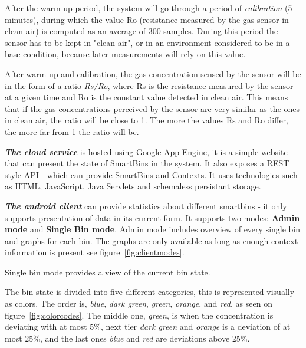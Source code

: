 After the warm-up period, the system will go through a period of \textit{calibration} (5 minutes), during which the value Ro (resistance measured by the gas sensor in clean air) is computed as an average of 300 samples.
During this period the sensor has to be kept in "clean air", or  in an environment considered to be in a base condition, because later measurements will rely on this value.

After warm up and calibration, the gas concentration sensed by the sensor will be in the form of a ratio \textit{Rs/Ro}, where Rs is the resistance measured by the sensor at a given time and Ro is the constant value detected in clean air.
This means that if the gas concentrations perceived by the sensor are very similar as the ones in clean air, the ratio will be close to 1.
The more the values Rs and Ro differ, the more far from 1 the ratio will be.

\textit{ \textbf{The cloud service}} is hosted using Google App Engine, it is a simple website that can present the state of SmartBins in the system. It also exposes a REST style API - which can provide SmartBins and Contexts.
It uses technologies such as HTML, JavaScript, Java Servlets and schemaless persistant storage.

\textit{\textbf{The android client}} can provide statistics about different smartbins - it only supports  presentation of data in its current form.
It supports two modes: \textbf{Admin mode} and \textbf{Single Bin mode}.
Admin mode includes overview of every single bin and graphs for each bin. The graphs are only available as long as enough context information is present see figure~\ref{fig:clientmodes}.

 Single bin mode provides a view of the current bin state.
 
 The bin state is divided into five different categories, this is represented visually as colors.
 The order is, \textit{blue}, \textit{dark green}, \textit{green}, \textit{orange}, and \textit{red}, as seen on figure~\ref{fig:colorcodes}.
The middle one, \textit{green}, is when the concentration is deviating with at most 5\%, next tier \textit{dark green} and \textit{orange} is a deviation of at most 25\%, and the last ones \textit{blue} and \textit{red} are deviations above 25\%.

